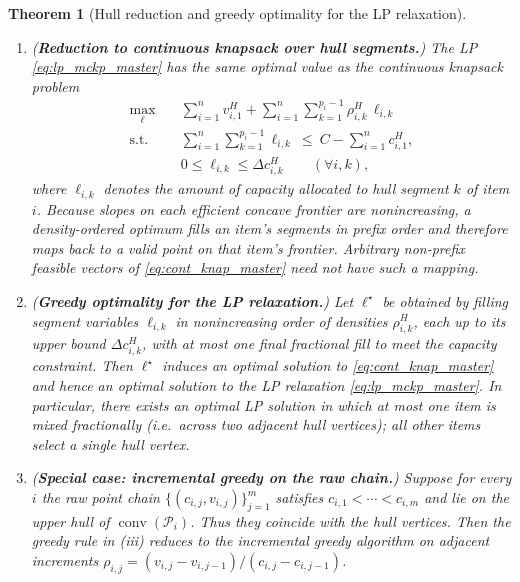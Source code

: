 \documentclass[11pt, a4paper]{article}
\theoremstyle{plain}
\newtheorem{theorem}{Theorem}
\theoremstyle{definition}
\theoremstyle{remark}
\begin{document}
\begin{theorem}[Hull reduction and greedy optimality for the LP relaxation]
\begin{enumerate}
\item[(ii)] (\textbf{Reduction to continuous knapsack over hull segments.})
The LP \eqref{eq:lp_mckp_master} has the same optimal value as the continuous knapsack problem
\begin{align}\label{eq:cont_knap_master}
\max_{\bm{\ell}} \quad & \sum_{i=1}^n v^H_{i,1}+\sum_{i=1}^n\sum_{k=1}^{p_i-1}\rho^H_{i,k}\,\ell_{i,k}\\
\text{s.t.}\quad & \sum_{i=1}^n\sum_{k=1}^{p_i-1}\ell_{i,k}\ \le\ C-\sum_{i=1}^n c^H_{i,1},\nonumber\\
& 0\le \ell_{i,k}\le \Delta c^H_{i,k}\qquad(\forall i,k),\nonumber
\end{align}
where $\ell_{i,k}$ denotes the amount of capacity allocated to hull segment $k$ of item $i$.  Because slopes on each efficient
concave frontier are nonincreasing, a density-ordered optimum fills an item's segments in prefix order and therefore maps back to a valid
point on that item's frontier.  Arbitrary non-prefix feasible vectors of \eqref{eq:cont_knap_master} need not have such a mapping.

\item[(iii)] (\textbf{Greedy optimality for the LP relaxation.})
Let $\bm{\ell}^\star$ be obtained by filling segment variables $\ell_{i,k}$ in nonincreasing order of densities $\rho^H_{i,k}$,
each up to its upper bound $\Delta c^H_{i,k}$, with at most one final fractional fill to meet the capacity constraint.
Then $\bm{\ell}^\star$ induces an optimal solution to \eqref{eq:cont_knap_master} and hence an optimal solution to the LP relaxation
\eqref{eq:lp_mckp_master}. In particular, there exists an optimal LP solution in which at most one item is mixed fractionally
(i.e.\ across two adjacent hull vertices); all other items select a single hull vertex.

\item[(iv)] (\textbf{Special case: incremental greedy on the raw chain.})
Suppose for every $i$ the raw point chain $\{(c_{i,j},v_{i,j})\}_{j=1}^m$ satisfies
$c_{i,1}<\cdots<c_{i,m}$ and lie on the upper hull of $\operatorname{conv}(\mathcal P_i)$.
Thus they coincide with the hull vertices.
Then the greedy rule in (iii) reduces to the \emph{incremental greedy algorithm} on adjacent increments
$\rho_{i,j}=(v_{i,j}-v_{i,j-1})/(c_{i,j}-c_{i,j-1})$.
\end{enumerate}
\end{theorem}
\end{document}
